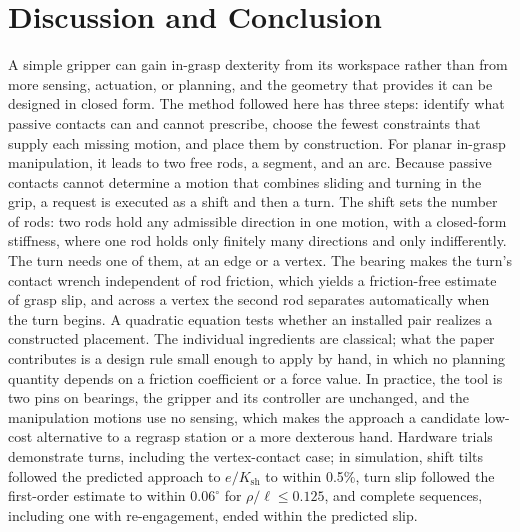 \section{Discussion and Conclusion}
\label{sec:discussion}
\label{sec:conclusion}

A simple gripper can gain in-grasp dexterity from its workspace rather than from more sensing, actuation, or planning, and the geometry that provides it can be designed in closed form. The method followed here has three steps: identify what passive contacts can and cannot prescribe, choose the fewest constraints that supply each missing motion, and place them by construction. For planar in-grasp manipulation, it leads to two free rods, a segment, and an arc. Because passive contacts cannot determine a motion that combines sliding and turning in the grip, a request is executed as a shift and then a turn. The shift sets the number of rods: two rods hold any admissible direction in one motion, with a closed-form stiffness, where one rod holds only finitely many directions and only indifferently. The turn needs one of them, at an edge or a vertex. The bearing makes the turn's contact wrench independent of rod friction, which yields a friction-free estimate of grasp slip, and across a vertex the second rod separates automatically when the turn begins. A quadratic equation tests whether an installed pair realizes a constructed placement. The individual ingredients are classical; what the paper contributes is a design rule small enough to apply by hand, in which no planning quantity depends on a friction coefficient or a force value. In practice, the tool is two pins on bearings, the gripper and its controller are unchanged, and the manipulation motions use no sensing, which makes the approach a candidate low-cost alternative to a regrasp station or a more dexterous hand. Hardware trials demonstrate turns, including the vertex-contact case; in simulation, shift tilts followed the predicted approach to $e/K_{\mathrm{sh}}$ to within 0.5\%, turn slip followed the first-order estimate to within $0.06^{\circ}$ for $\rho/\ell\leq0.125$, and complete sequences, including one with re-engagement, ended within the predicted slip.

